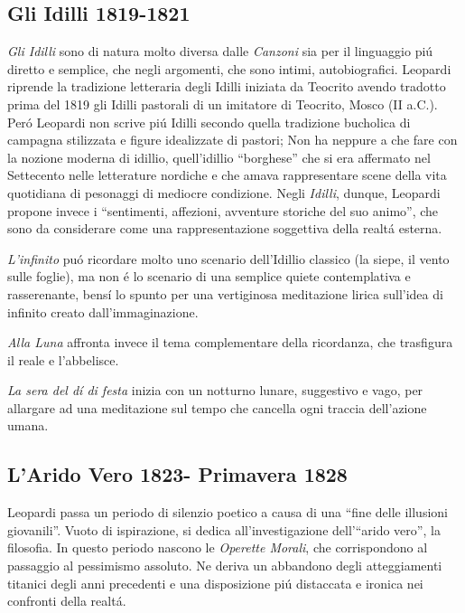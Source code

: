\documentclass{report}
\begin{document}
\subsection*{Gli Idilli 1819-1821}
\emph{Gli Idilli} sono di natura molto diversa dalle \emph{Canzoni} sia per il linguaggio piú diretto e semplice, che negli argomenti, che sono intimi, autobiografici. Leopardi riprende la tradizione letteraria degli Idilli iniziata da Teocrito avendo tradotto prima del 1819 gli Idilli pastorali di un imitatore di Teocrito, Mosco (II a.C.). Peró Leopardi non scrive piú Idilli secondo quella tradizione bucholica di campagna stilizzata e figure idealizzate di pastori; Non ha neppure a che fare con la nozione moderna di idillio, quell'idillio ``borghese'' che si era affermato nel Settecento nelle letterature nordiche e che amava rappresentare scene della vita quotidiana di pesonaggi di mediocre condizione. Negli \emph{Idilli}, dunque, Leopardi propone invece i ``sentimenti, affezioni, avventure storiche del suo animo'', che sono da considerare come una rappresentazione soggettiva della realtá esterna.

\emph{L'infinito} puó ricordare molto uno scenario dell'Idillio classico (la siepe, il vento sulle foglie), ma non é lo scenario di una semplice quiete contemplativa e rasserenante, bensí lo spunto per una vertiginosa meditazione lirica sull'idea di infinito creato dall'immaginazione.

\emph{Alla Luna} affronta invece il tema complementare della ricordanza, che trasfigura il reale e l'abbelisce.

\emph{La sera del dí di festa} inizia con un notturno lunare, suggestivo e vago, per allargare ad una meditazione sul tempo che cancella ogni traccia dell'azione umana.
\subsection*{L'Arido Vero 1823- Primavera 1828}
Leopardi passa un periodo di silenzio poetico a causa di una ``fine delle illusioni giovanili''. Vuoto di ispirazione, si dedica all'investigazione dell'``arido vero'', la filosofia. In questo periodo nascono le \emph{Operette Morali}, che corrispondono al passaggio al pessimismo assoluto. Ne deriva un abbandono degli atteggiamenti titanici degli anni precedenti e una disposizione piú distaccata e ironica nei confronti della realtá.
\end{document}
